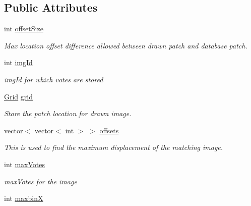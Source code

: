 \subsection*{\-Public \-Attributes}
\begin{DoxyCompactItemize}
\item 
\hypertarget{classImageVotes_ab091b6fc057a340e0dec1ec8ecdc2068}{int \hyperlink{classImageVotes_ab091b6fc057a340e0dec1ec8ecdc2068}{offset\-Size}}\label{classImageVotes_ab091b6fc057a340e0dec1ec8ecdc2068}

\begin{DoxyCompactList}\small\item\em \-Max location offset difference allowed between drawn patch and database patch. \end{DoxyCompactList}\item 
\hypertarget{classImageVotes_ae5270d0d4b6f9ae069b3cb926bd29c0e}{int \hyperlink{classImageVotes_ae5270d0d4b6f9ae069b3cb926bd29c0e}{img\-Id}}\label{classImageVotes_ae5270d0d4b6f9ae069b3cb926bd29c0e}

\begin{DoxyCompactList}\small\item\em img\-Id for which votes are stored \end{DoxyCompactList}\item 
\hypertarget{classImageVotes_a244e45706478d62a53b13db049b47b52}{\hyperlink{classGrid}{\-Grid} \hyperlink{classImageVotes_a244e45706478d62a53b13db049b47b52}{grid}}\label{classImageVotes_a244e45706478d62a53b13db049b47b52}

\begin{DoxyCompactList}\small\item\em \-Store the patch location for drawn image. \end{DoxyCompactList}\item 
vector$<$ vector$<$ int $>$ $>$ \hyperlink{classImageVotes_a6db69485a42c5fae731e4800b08a5b26}{offsets}
\begin{DoxyCompactList}\small\item\em \-This is used to find the maximum displacement of the matching image. \end{DoxyCompactList}\item 
\hypertarget{classImageVotes_a63af62d90937f1f65c6c6bf6ea071c5f}{int \hyperlink{classImageVotes_a63af62d90937f1f65c6c6bf6ea071c5f}{max\-Votes}}\label{classImageVotes_a63af62d90937f1f65c6c6bf6ea071c5f}

\begin{DoxyCompactList}\small\item\em max\-Votes for the image \end{DoxyCompactList}\item 
\hypertarget{classImageVotes_abf09b33968b11ab551f472ad16eab411}{int \hyperlink{classImageVotes_abf09b33968b11ab551f472ad16eab411}{maxbin\-X}}\label{classImageVotes_abf09b33968b11ab551f472ad16eab411}


\end{DoxyCompactItemize}
